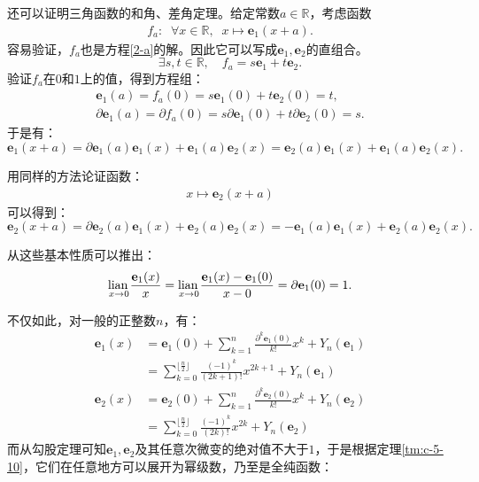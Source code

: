 \documentclass[12pt,UTF8,fontset=none]{ctexbook}
\begin{document}
\begin{appendix}
还可以证明三角函数的和角、差角定理。给定常数$a\in\mathbb{R}$，考虑函数
\begin{align*}
    f_a: \;\; \forall x\in \mathbb{R}, \;\; x\mapsto \mathbf{e}_1(x + a).
\end{align*}
容易验证，$f_a$也是方程\eqref{2-a}的解。因此它可以写成$\mathbf{e}_1, \mathbf{e}_2$的直组合。
$$ \exists s, t \in \mathbb{R}, \quad f_a = s\mathbf{e}_1 + t\mathbf{e}_2. $$
验证$f_a$在$0$和$1$上的值，得到方程组：
$$
\begin{array}{ll}
    \mathbf{e}_1(a) = f_a(0) = s\mathbf{e}_1(0) + t \mathbf{e}_2(0) = t,\\
    \partial \mathbf{e}_1(a) = \partial f_a(0) = s\partial \mathbf{e}_1(0) + t \partial \mathbf{e}_2(0) = s.
\end{array}
$$
于是有：
$$ \mathbf{e}_1(x + a) = \partial \mathbf{e}_1(a)\mathbf{e}_1(x) + \mathbf{e}_1(a)\mathbf{e}_2(x) =  \mathbf{e}_2(a)\mathbf{e}_1(x) + \mathbf{e}_1(a)\mathbf{e}_2(x). $$

用同样的方法论证函数：
\begin{align*}
    x\mapsto \mathbf{e}_2(x + a)
\end{align*}
可以得到：
$$ \mathbf{e}_2(x + a) = \partial \mathbf{e}_2(a)\mathbf{e}_1(x) + \mathbf{e}_2(a)\mathbf{e}_2(x) = -\mathbf{e}_1(a)\mathbf{e}_1(x) + \mathbf{e}_2(a)\mathbf{e}_2(x). $$

从这些基本性质可以推出：
\begin{align*}
    \underset{x\to 0}{\operatorname{lian}\,} \frac{\mathbf{e}_1(x)}{x} = \underset{x\to 0}{\operatorname{lian}\,} \frac{\mathbf{e}_1(x) - \mathbf{e}_1(0)}{x - 0} = \partial \mathbf{e}_1(0) = 1.
\end{align*}

不仅如此，对一般的正整数$n$，有：
\begin{align*}
    \mathbf{e}_1(x) &= \mathbf{e}_1(0) + \sum_{k=1}^n \frac{\partial^k \mathbf{e}_1 (0)}{k!}x^k + Y_n(\mathbf{e}_1) \\
    &= \sum_{k=0}^{\lfloor\frac{n}{2}\rfloor} \frac{(-1)^{k}}{(2k+1)!}x^{2k+1}  + Y_n(\mathbf{e}_1) \\
    \mathbf{e}_2(x) &= \mathbf{e}_2(0) + \sum_{k=1}^n \frac{\partial^k \mathbf{e}_2 (0)}{k!}x^k  + Y_n(\mathbf{e}_2) \\
    &= \sum_{k=0}^{\lfloor\frac{n}{2}\rfloor} \frac{(-1)^{k}}{(2k)!}x^{2k} + Y_n(\mathbf{e}_2) 
\end{align*}
而从勾股定理可知$\mathbf{e}_1, \mathbf{e}_2$及其任意次微变的绝对值不大于$1$，于是根据定理\ref{tm:c-5-10}，它们在任意地方可以展开为幂级数，乃至是全纯函数：


\end{appendix}
\end{document}
